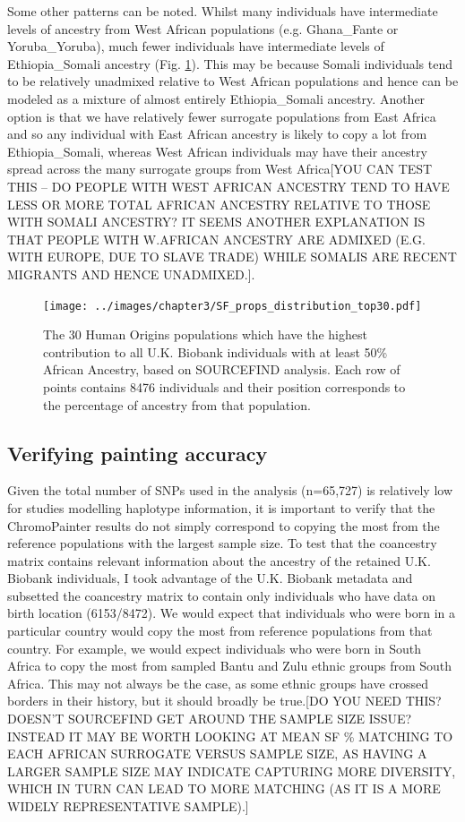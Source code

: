 {Some other patterns can be noted. Whilst many individuals have intermediate levels of ancestry from West African populations (e.g. Ghana\_Fante or Yoruba\_Yoruba), much fewer individuals have intermediate levels of Ethiopia\_Somali ancestry (Fig. \ref{fig:SF_props_distribution_top30}). This may be because Somali individuals tend to be relatively unadmixed relative to West African populations and hence can be modeled as a mixture of almost entirely Ethiopia\_Somali ancestry. Another option is that we have relatively fewer surrogate populations from East Africa and so any individual with East African ancestry is likely to copy a lot from Ethiopia\_Somali, whereas West African individuals may have their ancestry spread across the many surrogate groups from West Africa{\color{red}[YOU CAN TEST THIS -- DO PEOPLE WITH WEST AFRICAN ANCESTRY TEND TO HAVE LESS OR MORE TOTAL AFRICAN ANCESTRY RELATIVE TO THOSE WITH SOMALI ANCESTRY? IT SEEMS ANOTHER EXPLANATION IS THAT PEOPLE WITH W.AFRICAN ANCESTRY ARE ADMIXED (E.G. WITH EUROPE, DUE TO SLAVE TRADE) WHILE SOMALIS ARE RECENT MIGRANTS AND HENCE UNADMIXED.]}. 

\begin{figure}[htp]
    \centering
    \texttt{[image: ../images/chapter3/SF\_props\_distribution\_top30.pdf]}
    \caption{The 30 Human Origins populations which have the highest contribution to all U.K. Biobank individuals with at least 50\% African Ancestry, based on SOURCEFIND analysis. Each row of points contains 8476 individuals and their position corresponds to the percentage of ancestry from that population. }
    \label{fig:SF_props_distribution_top30}
\end{figure}

\subsection{Verifying painting accuracy}

Given the total number of SNPs used in the analysis (n=65,727) is {\color{red}relatively low for studies modelling haplotype information}, it is important to verify that the ChromoPainter results do not simply correspond to copying the most from the reference populations with the largest sample size. To test that the coancestry matrix contains relevant information about the ancestry of the retained U.K. Biobank individuals, I took advantage of the U.K. Biobank metadata and subsetted the coancestry matrix to contain only individuals who have data on birth location (6153/8472). We would expect that individuals who were born in a particular country would copy the most from reference populations from that country. For example, we would expect individuals who were born in South Africa to copy the most from sampled Bantu and Zulu ethnic groups from South Africa. This may not always be the case, as some ethnic groups have crossed borders in their history, but it should broadly be true.{\color{red}[DO YOU NEED THIS? DOESN'T SOURCEFIND GET AROUND THE SAMPLE SIZE ISSUE? INSTEAD IT MAY BE WORTH LOOKING AT MEAN SF \% MATCHING TO EACH AFRICAN SURROGATE VERSUS SAMPLE SIZE, AS HAVING A LARGER SAMPLE SIZE MAY INDICATE CAPTURING MORE DIVERSITY, WHICH IN TURN CAN LEAD TO MORE MATCHING (AS IT IS A MORE WIDELY REPRESENTATIVE SAMPLE).]}

}
